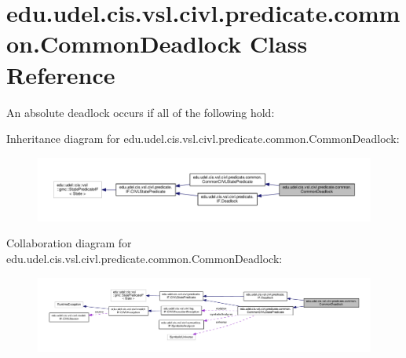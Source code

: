 \hypertarget{classedu_1_1udel_1_1cis_1_1vsl_1_1civl_1_1predicate_1_1common_1_1CommonDeadlock}{}\section{edu.\+udel.\+cis.\+vsl.\+civl.\+predicate.\+common.\+Common\+Deadlock Class Reference}
\label{classedu_1_1udel_1_1cis_1_1vsl_1_1civl_1_1predicate_1_1common_1_1CommonDeadlock}


An absolute deadlock occurs if all of the following hold\+:  




Inheritance diagram for edu.\+udel.\+cis.\+vsl.\+civl.\+predicate.\+common.\+Common\+Deadlock\+:
\nopagebreak
\begin{figure}[H]
\begin{center}
\leavevmode
\includegraphics[width=350pt]{classedu_1_1udel_1_1cis_1_1vsl_1_1civl_1_1predicate_1_1common_1_1CommonDeadlock__inherit__graph}
\end{center}
\end{figure}


Collaboration diagram for edu.\+udel.\+cis.\+vsl.\+civl.\+predicate.\+common.\+Common\+Deadlock\+:
\nopagebreak
\begin{figure}[H]
\begin{center}
\leavevmode
\includegraphics[width=350pt]{classedu_1_1udel_1_1cis_1_1vsl_1_1civl_1_1predicate_1_1common_1_1CommonDeadlock__coll__graph}
\end{center}
\end{figure}
